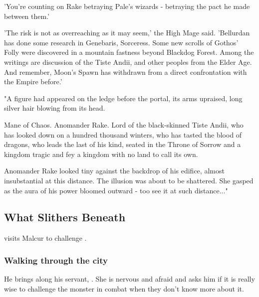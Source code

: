 \begin{garbage}
{  'You're counting on Rake betraying Pale's wizards - betraying the pact he made between them.'
  
  'The risk is not as overreaching as it may seem,' the High Mage said. 'Bellurdan has done some research in Genebaris, Sorceress. Some new scrolls of Gothos' Folly were discovered in a mountain fastness beyond Blackdog Forest. Among the writings are discussion of the Tiste Andii, and other peoples from the Elder Age. And remember, Moon's Spawn has withdrawn from a direct confrontation with the Empire before.'
  
  "A figure had appeared on the ledge before the portal, its arms upraised, long silver hair blowing from its head.
  
  Mane of Chaos. 
  Anomander Rake. 
  Lord of the black-skinned Tiste Andii, 
  who has looked down on a hundred thousand winters, 
  who has tasted the blood of dragons, 
  who leads the last of his kind, 
  seated in the Throne of Sorrow 
  and a kingdom tragic and fey\dash
  a kingdom with no land to call its own.
  
  Anomander Rake looked tiny against the backdrop of his edifice, almost insubstantial at this distance. The illusion was about to be shattered. She gasped as the aura of his power bloomed outward - too see it at such distance..."
}



 






\subsection{What Slithers Beneath}
 visits Malcur to challenge .





\subsubsection{Walking through the city}
He brings along his servant, . She is nervous and afraid and asks him if it is really wise to challenge the monster in combat when they don't know more about it.


\end{garbage}
